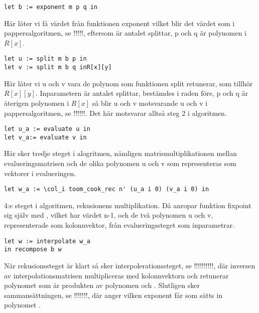 \begin{lstlisting}
let b := exponent m p q in
\end{lstlisting}

Här låter vi  få värdet från funktionen exponent vilket blir det värdet
som i pappersalgoritmen, se !!!!!, eftersom  är antalet splittar, p och q
är polynomen i $R[x]$.

\begin{lstlisting}
let u := split m b p in
let v := split m b q inR[x][y]
\end{lstlisting}

Här låter vi u och v vara de polynom som funktionen split retunerar, som
tillhör $R[x][y]$. Inparametern  är antalet splittar,  bestämdes i
raden före, p och q är återigen polynomen i $R[x]$ så blir u och v motsvarande
u och v i pappersalgoritmen, se !!!!!!. Det här motsvarar alltså steg 2 i
algoritmen.

\begin{lstlisting}
let u_a := evaluate u in
let v_a:= evaluate v in
\end{lstlisting}

Här sker tredje steget i alogritmen, nämligen matrismultiplikationen mellan
evalueringsmatrisen och de olika polynomen u och v som representeras som
vektorer i evalueringen.

\begin{lstlisting}
let w_a := \col_i toom_cook_rec n' (u_a i 0) (v_a i 0) in
\end{lstlisting}

4:e steget i algoritmen, rekusionens multiplikation. Då anropar funktion
fixpoint sig själv med , vilket har värdet n-1, och de två polynomen u
och v, representerade som kolonnvektor, från evalueringssteget som
inparametrar.

\begin{lstlisting}
let w := interpolate w_a
in recompose b w
\end{lstlisting}

När rekusionssteget är klart så sker interpolerationssteget, se !!!!!!!!!!, där
inversen av interpolationsmatrisen multipliceras med kolonnvektorn  och
retunerar polynomet  som är produkten av polynomen  och .
Slutligen sker sammansättningen, se !!!!!!!, där  anger vilken exponent
 får som sätts in polynomet .
